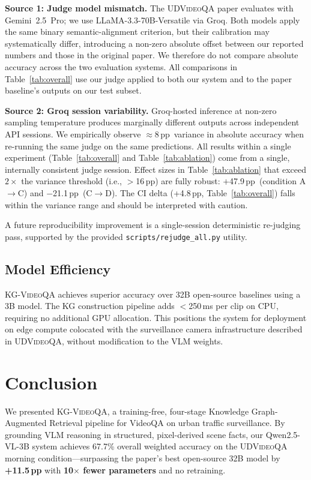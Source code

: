 \documentclass[10pt,conference,compsoc]{IEEEtran}
\newcommand{\ours}{\textsc{KG-VideoQA}}
\newcommand{\dataset}{\textsc{UDVideoQA}}
\newcommand{\pp}{\,pp}                     %
\begin{document}
\textbf{Source 1: Judge model mismatch.}
The \dataset{} paper evaluates with Gemini~2.5~Pro; we use
LLaMA-3.3-70B-Versatile via Groq.
Both models apply the same binary semantic-alignment criterion,
but their calibration may systematically differ, introducing
a non-zero absolute offset between our reported numbers and those
in the original paper.
We therefore do not compare absolute accuracy across the two
evaluation systems.
All comparisons in Table~\ref{tab:overall} use our judge applied
to both our system and to the paper baseline's outputs on our
test subset.

\textbf{Source 2: Groq session variability.}
Groq-hosted inference at non-zero sampling temperature produces
marginally different outputs across independent API sessions.
We empirically observe ${\approx}8$\pp\ variance in absolute
accuracy when re-running the same judge on the same predictions.
All results within a single experiment
(Table~\ref{tab:overall} and Table~\ref{tab:ablation}) come from
a single, internally consistent judge session.
Effect sizes in Table~\ref{tab:ablation} that exceed $2\times$ the
variance threshold (i.e., $>$16\pp) are fully robust:
$+$47.9\pp\ (condition A$\to$C) and $-$21.1\pp\ (C$\to$D).
The CI delta (+4.8\pp, Table~\ref{tab:overall}) falls within the
variance range and should be interpreted with caution.

A future reproducibility improvement is a single-session
deterministic re-judging pass, supported by the provided
\texttt{scripts/rejudge\_all.py} utility.

\subsection{Model Efficiency}

\ours{} achieves superior accuracy over 32B open-source baselines
using a 3B model.
The KG construction pipeline adds $<$250\,ms per clip on CPU,
requiring no additional GPU allocation.
This positions the system for deployment on edge compute colocated
with the surveillance camera infrastructure described in
\dataset{}, without modification to the VLM weights.


\section{Conclusion}
\label{sec:conclusion}

We presented \ours{}, a training-free, four-stage Knowledge
Graph-Augmented Retrieval pipeline for VideoQA on urban traffic
surveillance.
By grounding VLM reasoning in structured, pixel-derived scene
facts, our Qwen2.5-VL-3B system achieves 67.7\% overall weighted
accuracy on the \dataset{} morning condition---surpassing the
paper's best open-source 32B model by \textbf{+11.5\pp} with
\textbf{10$\times$ fewer parameters} and no retraining.
\end{document}
